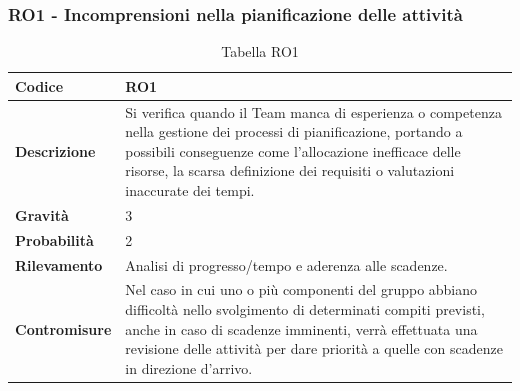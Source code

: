 \documentclass{article}
\begin{document}
    \subsubsection{RO1 - Incomprensioni nella pianificazione delle attività}
    \begin{table}[H]
        \renewcommand{\arraystretch}{1.5}
        \centering
        \begin{tabular}{|p{3cm}|p{11cm}|}
            \hline
            \textbf{Codice} & RO1 \\
            \hline
            \textbf{Descrizione} & Si verifica quando il Team manca di esperienza o competenza nella gestione dei processi di pianificazione, portando a possibili conseguenze come l’allocazione inefficace delle risorse, la scarsa definizione dei requisiti o valutazioni inaccurate dei tempi. \\
            \hline
            \textbf{Gravità} & 3 \\
            \hline
            \textbf{Probabilità} & 2 \\
            \hline
            \textbf{Rilevamento} & Analisi di progresso/tempo e aderenza alle scadenze. \\
            \hline
            \textbf{Contromisure} & Nel caso in cui uno o più componenti del gruppo abbiano difficoltà nello svolgimento di determinati compiti previsti, anche in caso di scadenze imminenti, verrà effettuata una revisione delle attività per dare priorità a quelle con scadenze in direzione d’arrivo. \\
            \hline
        \end{tabular}
        \caption{Tabella RO1}
    \end{table}
\end{document}
